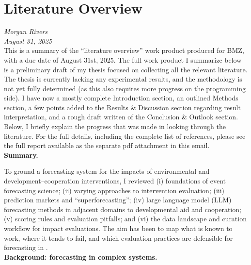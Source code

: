 \documentclass[12pt,a4paper]{article}
\newcommand{\AuthorName}{Morgan Rivers}
\begin{document}
\thispagestyle{empty}

\setcounter{page}{1}
\clearpage

\setcounter{page}{1}
\section*{Literature Overview}
\emph{\AuthorName}\\
\emph{August 31, 2025}\\


This is a summary of the ``literature overview'' work product produced for BMZ, with a due date of August 31st, 2025. The full work product I summarize below is a preliminary draft of my thesis focused on collecting all the relevant literature. The thesis is currently lacking any experimental results, and the methodology is not yet fully determined (as this also requires more progress on the programming side). I have now a mostly complete Introduction section, an outlined Methods section, a few points added to the Results \& Discussion section regarding result interpretation, and a rough draft written of the Conclusion \& Outlook section. Below, I briefly explain the progress that was made in looking through the literature. For the full details, including the complete list of references, please see the full report available as the separate pdf attachment in this email. \\ 

\textbf{Summary.}

To ground a forecasting system for the impacts of environmental and development–cooperation interventions, I reviewed (i) foundations of event forecasting science; (ii) varying approaches to intervention evaluation; (iii) prediction markets and ``superforecasting''; (iv) large language model (LLM) forecasting methods in adjacent domains to developmental aid and cooperation; (v) scoring rules and evaluation pitfalls; and (vi) the data landscape and curation workflow for impact evaluations. The aim has been to map what is known to work, where it tends to fail, and which evaluation practices are defensible for forecasting in \ABSTRACT.\\


\textbf{Background: forecasting in complex systems.}
\end{document}
